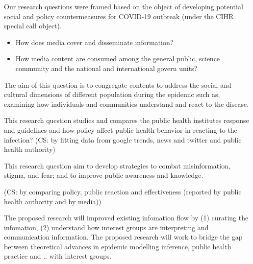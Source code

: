 Our research questions were framed based on the object of developing potential social and policy countermeasures for COVID-19 outbreak (under the CIHR special call object).

\begin{itemize}
\item{How does media cover and disseminate information?}
\item{How media content are consumed among the general public, science community and the national and international govern units?}
\end{itemize}

The aim of this question is to congregate contents to address the social and cultural dimensions of different population during the epidemic such as, examining how individuals and communities understand and react to the disease.


This research question studies and compares the public health institutes response and guidelines and how policy affect public health behavior in reacting to the infection?
(CS: by fitting data from google trends, news and twitter and public health authority)


This research question aim to develop strategies to combat misinformation, stigma, and fear; and to improve public awareness and knowledge.

(CS: by comparing policy, public reaction and effectiveness (reported by public health authority and by media))

The proposed research will improved existing infomation flow by (1) curating the infomation, (2) understand how interest groups are interpreting and communication information. 
The proposed research will work to bridge the gap between theoretical advances in epidemic modelling inference, public health practice and .. with interest groups. 


